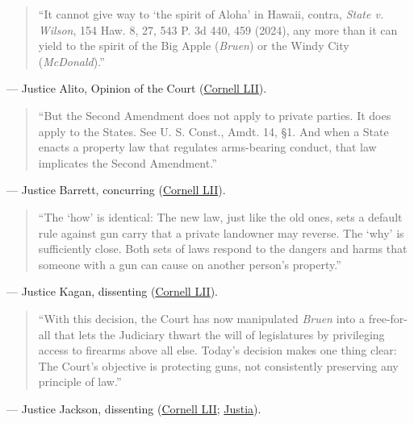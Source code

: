 \documentclass[12pt]{article}
\begin{document}
\begin{quote}
``It cannot give way to `the spirit of Aloha' in Hawaii, contra, \textit{State v. Wilson}, 154 Haw. 8, 27, 543 P. 3d 440, 459 (2024), any more than it can yield to the spirit of the Big Apple (\textit{Bruen}) or the Windy City (\textit{McDonald}).''
\end{quote}
\noindent --- Justice Alito, Opinion of the Court (\href{https://www.law.cornell.edu/supremecourt/text/24-1046}{Cornell LII}).

\begin{quote}
``But the Second Amendment does not apply to private parties. It does apply to the States. See U. S. Const., Amdt. 14, \S{}1. And when a State enacts a property law that regulates arms-bearing conduct, that law implicates the Second Amendment.''
\end{quote}
\noindent --- Justice Barrett, concurring (\href{https://www.law.cornell.edu/supremecourt/text/24-1046}{Cornell LII}).

\begin{quote}
``The `how' is identical: The new law, just like the old ones, sets a default rule against gun carry that a private landowner may reverse. The `why' is sufficiently close. Both sets of laws respond to the dangers and harms that someone with a gun can cause on another person's property.''
\end{quote}
\noindent --- Justice Kagan, dissenting (\href{https://www.law.cornell.edu/supremecourt/text/24-1046}{Cornell LII}).

\begin{quote}
``With this decision, the Court has now manipulated \textit{Bruen} into a free-for-all that lets the Judiciary thwart the will of legislatures by privileging access to firearms above all else. Today's decision makes one thing clear: The Court's objective is protecting guns, not consistently preserving any principle of law.''
\end{quote}
\noindent --- Justice Jackson, dissenting (\href{https://www.law.cornell.edu/supremecourt/text/24-1046}{Cornell LII}; \href{https://supreme.justia.com/cases/federal/us/609/24-1046/}{Justia}).
\end{document}

